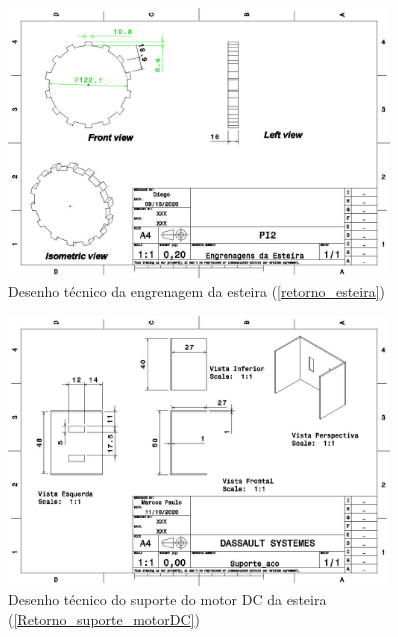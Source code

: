 \begin{apendicesenv}
\begin{figure}[H]
    \centering
    \includegraphics[width=0.9\textwidth]{figuras/estrutura/Desenhos/Drawing1_EngrenagemdaEsteira2.jpg}
    \caption{Desenho técnico da engrenagem da esteira (\ref{retorno_esteira})}
    \label{fig:engrenagem_esteira}
\end{figure}

\begin{figure}[H]
    \centering
    \includegraphics[width=0.9\textwidth]{figuras/estrutura/Desenhos/Suporte_MotorDC.jpg}
    \caption{Desenho técnico do suporte do motor DC da esteira (\ref{Retorno_suporte_motorDC})}
    \label{fig:supp_motordc}
\end{figure}


\end{apendicesenv}
